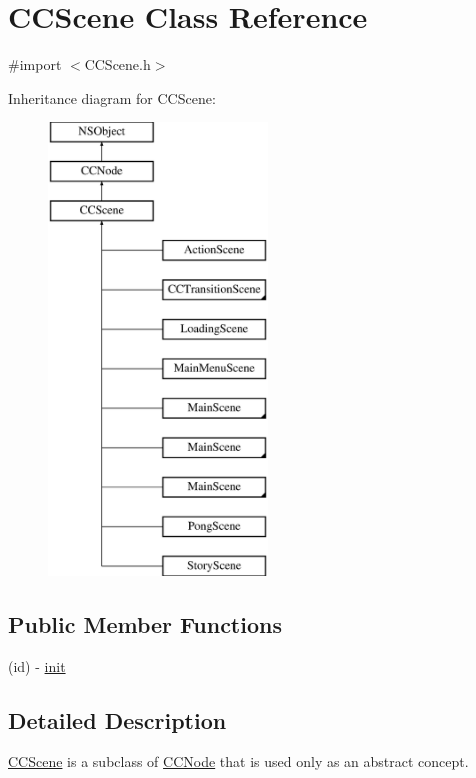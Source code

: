 \hypertarget{interface_c_c_scene}{\section{C\-C\-Scene Class Reference}
\label{interface_c_c_scene}
}


{\ttfamily \#import $<$C\-C\-Scene.\-h$>$}

Inheritance diagram for C\-C\-Scene\-:\begin{figure}[H]
\begin{center}
\leavevmode
\includegraphics[height=12.000000cm]{interface_c_c_scene}
\end{center}
\end{figure}
\subsection*{Public Member Functions}
\begin{DoxyCompactItemize}
\item 
(id) -\/ \hyperlink{interface_c_c_scene_a6ced7d1397204cb5dc2a5579e547ed0c}{init}
\end{DoxyCompactItemize}


\subsection{Detailed Description}
\hyperlink{interface_c_c_scene}{C\-C\-Scene} is a subclass of \hyperlink{class_c_c_node}{C\-C\-Node} that is used only as an abstract concept.

